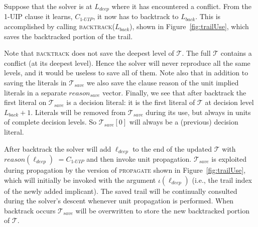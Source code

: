\documentclass[runningheads]{llncs}
\newcommand{\trail}{\ensuremath{\mathcal{T}}}
\newcommand{\trailIdx}[1]{\ensuremath{\iota(#1)}}
\newcommand{\reason}[1]{\ensuremath{\mathit{reason}(#1)}}
\newcommand{\uipcls}{C_{\textit{1-UIP}}}
\newcommand{\deepestLvl}{L_{\textit{deep}}}
\newcommand{\deepestLit}{\ell_{\textit{deep}}}
\newcommand{\btL}{L_{\textit{back}}}
\newcommand{\trailsave}{\trail_{\mathit{save}}}
\newcommand{\bt}{\textsc{backtrack}\xspace}
\begin{document}
Suppose that the solver is at $\deepestLvl$ where it has encountered a
conflict. From the 1-UIP clause it learns, $\uipcls$, it now has to
backtrack to $\btL$. This is accomplished by calling
\textsc{backtrack($\btL$)}, shown in Figure~\ref{fig:trailUse}, which
saves the backtracked portion of the trail.

Note that \bt does not save the deepest level of $\trail$. The full
$\trail$ contains a conflict (at its deepest level). Hence the solver
will never reproduce all the same levels, and it would be useless to
save all of them. Note also that in addition to saving the literals in
$\trailsave$ we also save the clause reason of the unit implied
literals in a separate $\mathit{reason_{save}}$ vector. Finally, we
see that after backtrack the first literal on $\trailsave$ is a
decision literal: it is the first literal of $\trail$ at decision
level $\btL+1$. Literals will be removed from $\trailsave$ during its
use, but always in units of complete decision levels. So
$\trailsave[0]$ will always be a (previous) decision literal.

After backtrack the solver will add $\deepestLit$ to the end of the
updated $\trail$ with $\reason{\deepestLit}$ $\mbox{}=\uipcls$ and
then invoke unit propagation. $\trailsave$ is exploited during
propagation by the version of \textsc{propagate} shown in
Figure~\ref{fig:trailUse}, which will initially be invoked with the
argument $\trailIdx{\deepestLit}$ (i.e., the trail index of the newly
added implicant). The saved trail will be continually consulted during the
solver's descent whenever unit propagation is performed. When
backtrack occurs $\trailsave$ will be overwritten to store the new
backtracked portion of $\trail$.
\end{document}
